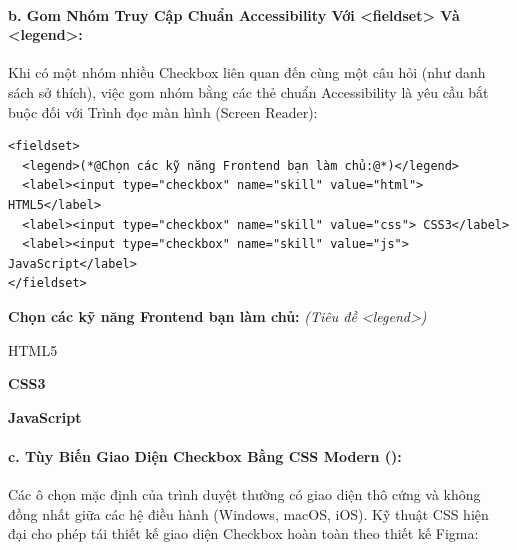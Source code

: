 \paragraph{b. Gom Nhóm Truy Cập Chuẩn Accessibility Với <fieldset> Và <legend>:}
Khi có một nhóm nhiều Checkbox liên quan đến cùng một câu hỏi (như danh sách sở thích), việc gom nhóm bằng các thẻ chuẩn Accessibility là yêu cầu bắt buộc đối với Trình đọc màn hình (Screen Reader):

\begin{codeWindow}
\begin{lstlisting}[language=HTML5]
<fieldset>
  <legend>(*@Chọn các kỹ năng Frontend bạn làm chủ:@*)</legend>
  <label><input type="checkbox" name="skill" value="html"> HTML5</label>
  <label><input type="checkbox" name="skill" value="css"> CSS3</label>
  <label><input type="checkbox" name="skill" value="js"> JavaScript</label>
</fieldset>
\end{lstlisting}
\end{codeWindow}

\begin{browserWindow}
\sffamily\small
\textbf{Chọn các kỹ năng Frontend bạn làm chủ:} \textcolor{codeComment}{\small\textit{(Tiêu đề <legend>)}} \\[6pt]
 \; HTML5 \qquad
{} \; \textbf{CSS3} \qquad
{} \; \textbf{JavaScript}
\end{browserWindow}

\paragraph{c. Tùy Biến Giao Diện Checkbox Bằng CSS Modern ():}
Các ô chọn mặc định của trình duyệt thường có giao diện thô cứng và không đồng nhất giữa các hệ điều hành (Windows, macOS, iOS). Kỹ thuật CSS hiện đại cho phép tái thiết kế giao diện Checkbox hoàn toàn theo thiết kế Figma:

